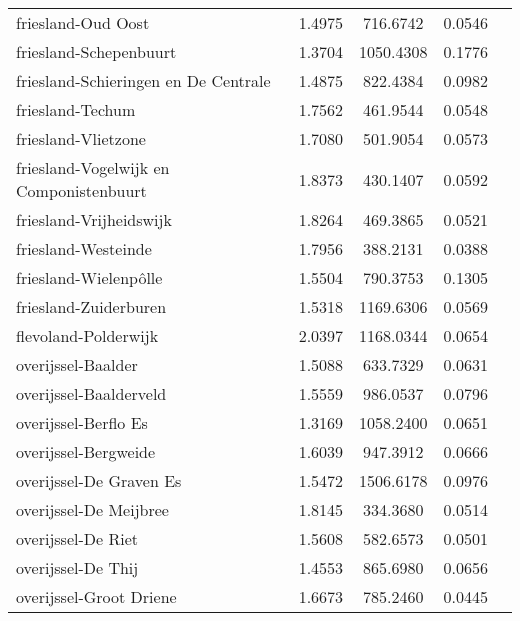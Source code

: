 \begin{longtable}{llccc}
	friesland-Oud Oost                        & 1.4975  & 716.6742  & 0.0546                 \\
	friesland-Schepenbuurt                    & 1.3704  & 1050.4308 & 0.1776                 \\
	friesland-Schieringen en De Centrale      & 1.4875  & 822.4384  & 0.0982                 \\
	friesland-Techum                          & 1.7562  & 461.9544  & 0.0548                 \\
	friesland-Vlietzone                       & 1.7080  & 501.9054  & 0.0573                 \\
	friesland-Vogelwijk en Componistenbuurt   & 1.8373  & 430.1407  & 0.0592                 \\
	friesland-Vrijheidswijk                   & 1.8264  & 469.3865  & 0.0521                 \\
	friesland-Westeinde                       & 1.7956  & 388.2131  & 0.0388                 \\
	friesland-Wielenpôlle                     & 1.5504  & 790.3753  & 0.1305                 \\
	friesland-Zuiderburen                     & 1.5318  & 1169.6306 & 0.0569                 \\
	flevoland-Polderwijk                      & 2.0397  & 1168.0344 & 0.0654                 \\
	overijssel-Baalder                        & 1.5088  & 633.7329  & 0.0631                 \\
	overijssel-Baalderveld                    & 1.5559  & 986.0537  & 0.0796                 \\
	overijssel-Berflo Es                      & 1.3169  & 1058.2400 & 0.0651                 \\
	overijssel-Bergweide                      & 1.6039  & 947.3912  & 0.0666                 \\
	overijssel-De Graven Es                   & 1.5472  & 1506.6178 & 0.0976                 \\
	overijssel-De Meijbree                    & 1.8145  & 334.3680  & 0.0514                 \\
	overijssel-De Riet                        & 1.5608  & 582.6573  & 0.0501                 \\
	overijssel-De Thij                        & 1.4553  & 865.6980  & 0.0656                 \\
	overijssel-Groot Driene                   & 1.6673  & 785.2460  & 0.0445                 \\

\end{longtable}
